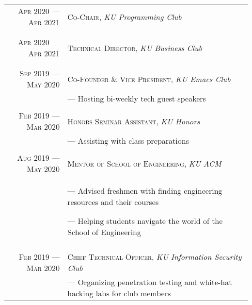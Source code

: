 \documentclass[a4paper, 10pt]{article}
\begin{document}
\begin{tabular}{r|p{11cm}}

	\textsc{Apr 2020 --- Apr 2021} & \textsc{Co-Chair}, \emph{KU Programming Club}                           \\&\footnotesize{
	}                                                                                                        \\\multicolumn{2}{c}{}\\

	\textsc{Apr 2020 --- Apr 2021} & \textsc{Technical Director}, \emph{KU Business Club}                    \\&\footnotesize{
	}                                                                                                        \\\multicolumn{2}{c}{}\\

	\textsc{Sep 2019 --- May 2020} & \textsc{Co-Founder \& Vice President}, \emph{KU Emacs Club}             \\&\footnotesize{
		--- Hosting bi-weekly tech guest speakers
	}                                                                                                        \\\multicolumn{2}{c}{}\\

	\textsc{Feb 2019 --- Mar 2020} & \textsc{Honors Seminar Assistant}, \emph{KU Honors}                     \\&\footnotesize{
		--- Assisting with class preparations
	}                                                                                                        \\\multicolumn{2}{c}{}\\

	\textsc{Aug 2019 --- May 2020} & \textsc{Mentor of School of Engineering}, \emph{KU ACM}                 \\&\footnotesize{
		--- Advised freshmen with finding engineering resources and their courses

		--- Helping students navigate the world of the School of Engineering
	}                                                                                                        \\\multicolumn{2}{c}{}\\

	\textsc{Feb 2019 --- Mar 2020} & \textsc{Chief Technical Officer}, \emph{KU Information Security Club}   \\&\footnotesize{
		--- Organizing penetration testing and white-hat hacking labs for club members

}
\end{tabular}
\end{document}
